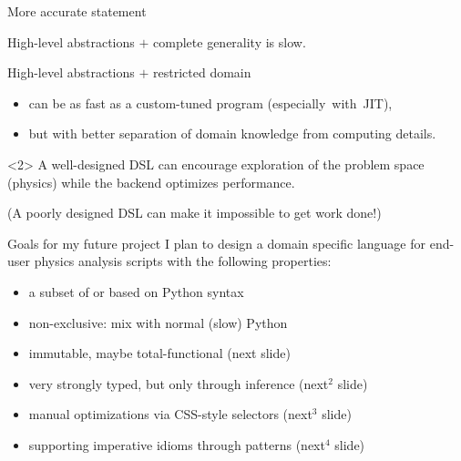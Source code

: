 \documentclass{beamer}
\begin{document}
\begin{frame}{More accurate statement}

\vfill
High-level abstractions $+$ complete generality is slow.

\vfill
High-level abstractions $+$ restricted domain
\begin{itemize}
\item can be as fast as a custom-tuned program \mbox{(especially with JIT),\hspace{-1 cm}}
\item but with better separation of domain knowledge from computing details.
\end{itemize}

\vfill
\begin{uncoverenv}<2>
A well-designed DSL can encourage exploration of the problem space (physics) while the backend optimizes performance.

\vspace{0.25 cm}
(A poorly designed DSL can make it impossible to get work done!)
\end{uncoverenv}
\end{frame}

\begin{frame}{Goals for my future project}
\vfill
I plan to design a domain specific language for end-user physics analysis scripts with the following properties:

\begin{itemize}
\item a subset of or based on Python syntax
\item non-exclusive: mix with normal (slow) Python
\item immutable, maybe total-functional (next slide)
\item very strongly typed, but only through inference (next$^2$ slide)
\item manual optimizations via CSS-style selectors (next$^3$ slide)
\item supporting imperative idioms through patterns (next$^4$ slide)
\end{itemize}

\vfill
{}

\vspace{0.1 cm}

\vspace{0.1 cm}
\end{frame}
\end{document}
